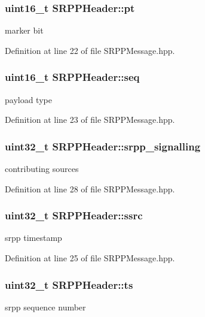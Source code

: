 \hypertarget{struct_s_r_p_p_header_a14ab4eb6c4e2a8fd74d096e46889e9fd}{
\subsubsection[{pt}]{\setlength{\rightskip}{0pt plus 5cm}uint16\_\-t {\bf SRPPHeader::pt}}}
\label{struct_s_r_p_p_header_a14ab4eb6c4e2a8fd74d096e46889e9fd}
marker bit 

Definition at line 22 of file SRPPMessage.hpp.

\hypertarget{struct_s_r_p_p_header_a4d1b2c6ff25a9a2b63c892a6bc6ed85a}{
\subsubsection[{seq}]{\setlength{\rightskip}{0pt plus 5cm}uint16\_\-t {\bf SRPPHeader::seq}}}
\label{struct_s_r_p_p_header_a4d1b2c6ff25a9a2b63c892a6bc6ed85a}
payload type 

Definition at line 23 of file SRPPMessage.hpp.

\hypertarget{struct_s_r_p_p_header_a1868f11a71da0fc414496fa7bfc51600}{
\subsubsection[{srpp\_\-signalling}]{\setlength{\rightskip}{0pt plus 5cm}uint32\_\-t {\bf SRPPHeader::srpp\_\-signalling}}}
\label{struct_s_r_p_p_header_a1868f11a71da0fc414496fa7bfc51600}
contributing sources 

Definition at line 28 of file SRPPMessage.hpp.

\hypertarget{struct_s_r_p_p_header_abf4b7d9bb620d2535acc1c804d61334b}{
\subsubsection[{ssrc}]{\setlength{\rightskip}{0pt plus 5cm}uint32\_\-t {\bf SRPPHeader::ssrc}}}
\label{struct_s_r_p_p_header_abf4b7d9bb620d2535acc1c804d61334b}
srpp timestamp 

Definition at line 25 of file SRPPMessage.hpp.

\hypertarget{struct_s_r_p_p_header_a52ccba459cf97fe589c90c4963214564}{
\subsubsection[{ts}]{\setlength{\rightskip}{0pt plus 5cm}uint32\_\-t {\bf SRPPHeader::ts}}}
\label{struct_s_r_p_p_header_a52ccba459cf97fe589c90c4963214564}
srpp sequence number 

